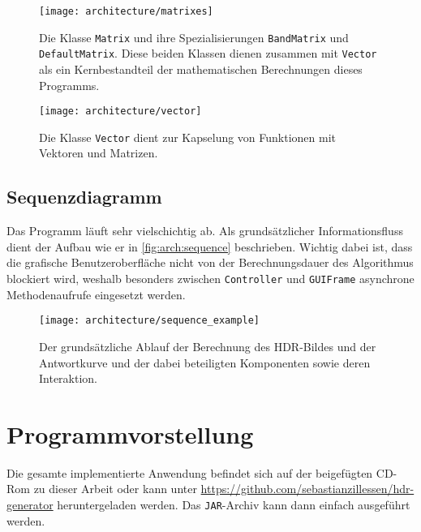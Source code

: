 \begin{figure}[H]
  \begin{center}
    \texttt{[image: architecture/matrixes]}
    \caption{Die Klasse \texttt{Matrix} und ihre Spezialisierungen \texttt{BandMatrix} und \texttt{DefaultMatrix}. Diese beiden Klassen dienen zusammen mit \texttt{Vector} als ein Kernbestandteil der mathematischen Berechnungen dieses Programms.}
    \label{fig:arch:matrix}
  \end{center}
\end{figure}


\begin{figure}[H]
  \begin{center}
    \texttt{[image: architecture/vector]}
    \caption{Die Klasse \texttt{Vector} dient zur Kapselung von Funktionen mit Vektoren und Matrizen.}
    \label{fig:arch:vector}
  \end{center}
\end{figure}


\subsection{Sequenzdiagramm}
Das Programm läuft sehr vielschichtig ab. Als grundsätzlicher Informationsfluss dient der Aufbau wie er in \autoref{fig:arch:sequence} beschrieben. Wichtig dabei ist, dass die grafische Benutzeroberfläche nicht von der Berechnungsdauer des Algorithmus blockiert wird, weshalb besonders zwischen \texttt{Controller} und \texttt{GUIFrame} asynchrone Methodenaufrufe eingesetzt werden.
\begin{figure}[H]
  \begin{center}
    \texttt{[image: architecture/sequence\_example]}
    \caption{Der grundsätzliche Ablauf der Berechnung des HDR-Bildes und der Antwortkurve und der dabei beteiligten Komponenten sowie deren Interaktion. }
    \label{fig:arch:sequence}
  \end{center}
\end{figure}

\section{Programmvorstellung}
\label{sec:sample-codes}
Die gesamte implementierte Anwendung befindet sich auf der beigefügten CD-Rom zu dieser Arbeit oder kann unter \url{https://github.com/sebastianzillessen/hdr-generator} heruntergeladen werden. Das \texttt{JAR}-Archiv kann dann einfach ausgeführt werden.


